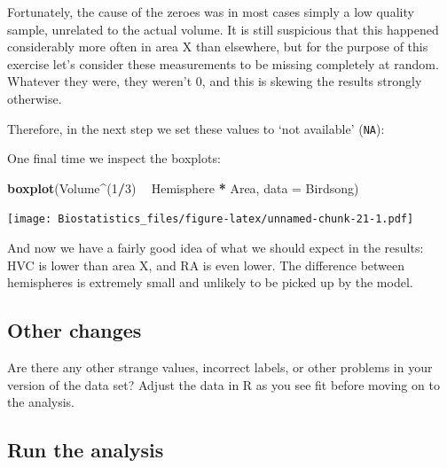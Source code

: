\documentclass[
]{book}
\newenvironment{Shaded}{\begin{snugshade}}{\end{snugshade}}
\newcommand{\DataTypeTok}[1]{\textcolor[rgb]{0.13,0.29,0.53}{#1}}
\newcommand{\DecValTok}[1]{\textcolor[rgb]{0.00,0.00,0.81}{#1}}
\newcommand{\KeywordTok}[1]{\textcolor[rgb]{0.13,0.29,0.53}{\textbf{#1}}}
\newcommand{\NormalTok}[1]{#1}
\newcommand{\OperatorTok}[1]{\textcolor[rgb]{0.81,0.36,0.00}{\textbf{#1}}}
\newcommand{\OtherTok}[1]{\textcolor[rgb]{0.56,0.35,0.01}{#1}}
\newcommand{\StringTok}[1]{\textcolor[rgb]{0.31,0.60,0.02}{#1}}
\begin{document}
Fortunately, the cause of the zeroes was in most cases simply a low quality sample, unrelated to the actual volume. It is still suspicious that this happened considerably more often in area X than elsewhere, but for the purpose of this exercise let's consider these measurements to be missing completely at random. Whatever they were, they weren't \(0\), and this is skewing the results strongly otherwise.

Therefore, in the next step we set these values to `not available' (\texttt{NA}):

\begin{Shaded}
\end{Shaded}

One final time we inspect the boxplots:

\begin{Shaded}
\begin{Highlighting}[]
\KeywordTok{boxplot}\NormalTok{(Volume}\OperatorTok{^}\NormalTok{(}\DecValTok{1}\OperatorTok{/}\DecValTok{3}\NormalTok{) }\OperatorTok{~}\StringTok{ }\NormalTok{Hemisphere }\OperatorTok{*}\StringTok{ }\NormalTok{Area, }\DataTypeTok{data =}\NormalTok{ Birdsong)}
\end{Highlighting}
\end{Shaded}

\texttt{[image: Biostatistics\_files/figure-latex/unnamed-chunk-21-1.pdf]}

And now we have a fairly good idea of what we should expect in the results: HVC is lower than area X, and RA is even lower. The difference between hemispheres is extremely small and unlikely to be picked up by the model.

\hypertarget{other-changes}{%
\subsection{Other changes}\label{other-changes}}

Are there any other strange values, incorrect labels, or other problems in your version of the data set? Adjust the data in R as you see fit before moving on to the analysis.

\hypertarget{run-the-analysis}{%
\subsection{Run the analysis}\label{run-the-analysis}}
\end{document}
